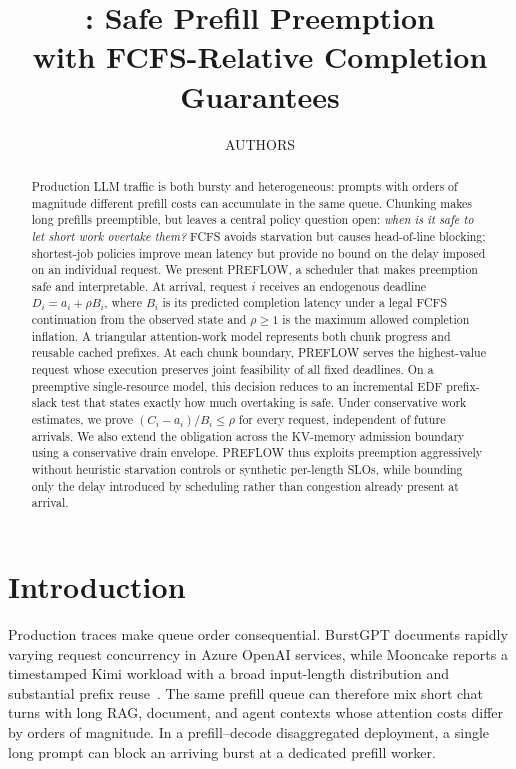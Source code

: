 \documentclass{article}
\title{\preflow: Safe Prefill Preemption\\
with FCFS-Relative Completion Guarantees}
\author{AUTHORS}
\newcommand{\preflow}{\textnormal{\textsc{PREFLOW}}}
\begin{document}
\maketitle

\begin{abstract}
Production LLM traffic is both bursty and heterogeneous: prompts with orders of
magnitude different prefill costs can accumulate in the same queue.  Chunking
makes long prefills preemptible, but leaves a central policy question open:
\emph{when is it safe to let short work overtake them?}  FCFS avoids starvation
but causes head-of-line blocking; shortest-job policies improve mean latency but
provide no bound on the delay imposed on an individual request.  We present
\preflow, a scheduler that makes preemption safe and interpretable.  At arrival,
request $i$ receives an endogenous deadline
$D_i=a_i+\rho B_i$, where $B_i$ is its predicted completion latency under a
legal FCFS continuation from the observed state and $\rho\geq1$ is the maximum
allowed completion inflation.  A triangular attention-work model represents
both chunk progress and reusable cached prefixes.  At each chunk boundary,
\preflow{} serves the
highest-value request whose execution preserves joint feasibility of all fixed
deadlines.  On a preemptive single-resource model, this decision reduces to an
incremental EDF prefix-slack test that states exactly how much overtaking is
safe.  Under conservative work estimates, we prove
$(C_i-a_i)/B_i\leq\rho$ for every request, independent of future arrivals.  We
also extend the obligation across the KV-memory admission boundary using a
conservative drain envelope.  \preflow{} thus exploits preemption aggressively
without heuristic starvation controls or synthetic per-length SLOs, while
bounding only the delay introduced by scheduling rather than congestion already
present at arrival.
\end{abstract}

\section{Introduction}
\label{sec:introduction}

Production traces make queue order consequential.  BurstGPT documents rapidly
varying request concurrency in Azure OpenAI services, while Mooncake reports a
timestamped Kimi workload with a broad input-length distribution and substantial
prefix reuse~\citep{wang2024burstgpt,qin2024mooncake}.  The same prefill queue can
therefore mix short chat turns with long RAG, document, and agent contexts whose
attention costs differ by orders of magnitude.  In a prefill--decode
disaggregated deployment, a single long prompt can block an arriving burst at a
dedicated prefill worker.
\end{document}
